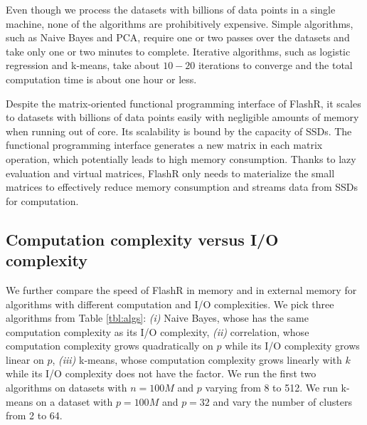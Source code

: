 Even though we process the datasets with billions of data points in a single
machine, none of the algorithms are prohibitively expensive. Simple algorithms,
such as Naive Bayes and PCA, require one or two passes over the datasets and
take only one or two minutes to complete. Iterative
algorithms, such as logistic regression and k-means, take about $10-20$
iterations to converge and the total computation time is about one hour or
less.

Despite the matrix-oriented functional programming interface of FlashR,
it scales to datasets with billions of data points easily with negligible
amounts of memory when running out of core.
Its scalability is bound by the capacity of SSDs. The functional programming
interface generates a new matrix in each matrix operation, which potentially
leads to high memory consumption. Thanks to lazy evaluation and virtual matrices,
FlashR only needs to materialize the small matrices to effectively reduce
memory consumption and streams data from SSDs for computation.

\subsection{Computation complexity versus I/O complexity}
We further compare the speed of FlashR in memory and in external memory
for algorithms with different computation and I/O complexities.
We pick three algorithms from Table \ref{tbl:algs}: \textit{(i)} Naive Bayes,
whose has the same computation complexity as its I/O complexity, \textit{(ii)}
correlation, whose computation complexity grows quadratically on $p$ while
its I/O complexity grows linear on $p$, \textit{(iii)} k-means, whose computation
complexity grows linearly with $k$ while its I/O complexity does not have
the factor. We run the first two algorithms on datasets with $n=100M$ and $p$
varying from 8 to 512. We run k-means on a dataset with $p=100M$ and $p=32$
and vary the number of clusters from 2 to 64.

